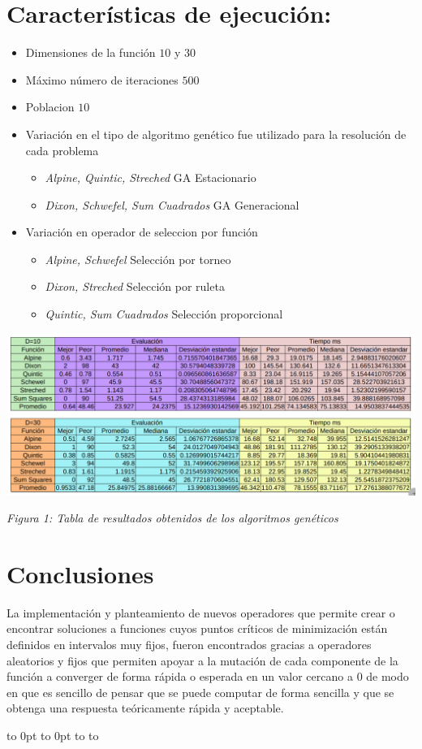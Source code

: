 \documentclass[10pt]{article}
\def\fillandplacepagenumber{%
 \par\pagestyle{empty}%
 \vbox to 0pt{\vss}\vfill
 \vbox to 0pt{\baselineskip0pt
   \hbox to\linewidth{\hss}%
   \baselineskip\footskip
   \hbox to\linewidth{%
     \hfil\thepage\hfil}\vss}}
\begin{document}
\section{Características de ejecución:}
\begin{itemize}
  \item Dimensiones de la función $10$ y $30$
  \item Máximo número de iteraciones $500$
  \item Poblacion $10$
  \item Variación en el tipo de algoritmo genético fue utilizado para la resolución de cada problema
  \begin{itemize}
    \item \textit{Alpine, Quintic, Streched }GA Estacionario
    \item \textit{Dixon, Schwefel, Sum Cuadrados} GA Generacional
  \end{itemize}
  \item Variación en operador de seleccion por función
  \begin{itemize}
    \item \textit{Alpine, Schwefel} Selección por torneo
    \item \textit{Dixon, Streched} Selección por ruleta
    \item \textit{Quintic, Sum Cuadrados} Selección proporcional
  \end{itemize}
\end{itemize}
\begin{landscape}
  \includegraphics[scale=0.5]{imgs/tablas.png}
  \begin{center}
    \textit{Figura 1: Tabla de resultados obtenidos de los algoritmos genéticos}
  \end{center}
  \section{Conclusiones}
  La implementación y planteamiento de nuevos operadores que permite crear o encontrar soluciones a funciones cuyos puntos críticos de minimización están definidos en intervalos muy fijos, fueron encontrados gracias a operadores aleatorios y fijos que permiten apoyar a la mutación de cada componente de la función a converger de forma rápida o esperada en un valor cercano a $0$ de modo en que es sencillo de pensar que se puede computar de forma sencilla y que se obtenga una respuesta teóricamente rápida y aceptable.
  \fillandplacepagenumber

\end{landscape}
\end{document}
